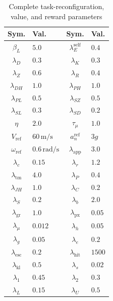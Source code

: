 \documentclass[unbranded]{cja}
\begin{document}
\begin{table}[!htbp]
\centering
\small
\setlength{\tabcolsep}{2.5pt}
\renewcommand{\arraystretch}{1.05}
\caption{Complete task-reconfiguration, value, and reward parameters}
\label{tab:complete-task-reward-parameters}
\begin{tabularx}{\linewidth}{@{}c >{\centering\arraybackslash}X c >{\centering\arraybackslash}X@{}}
\toprule
Sym. & Val. & Sym. & Val. \\
\midrule
$\beta_L$ & $5.0$ & $\lambda_E^{\mathrm{self}}$ & $0.4$ \\
$\lambda_D$ & $0.3$ & $\lambda_K$ & $0.3$ \\
$\lambda_Z$ & $0.6$ & $\lambda_R$ & $0.4$ \\
$\lambda_{DH}$ & $1.0$ & $\lambda_{PH}$ & $1.0$ \\
$\lambda_{PL}$ & $0.5$ & $\lambda_{SZ}$ & $0.5$ \\
$\lambda_{SL}$ & $0.3$ & $\lambda_{SD}$ & $0.2$ \\
$\eta$ & $2.0$ & $\tau_{\mu}$ & $1.0$ \\
$V_{\mathrm{ref}}$ & $60\,\mathrm{m/s}$ & $a_n^{\mathrm{ref}}$ & $3g$ \\
$\omega_{\mathrm{ref}}$ & $0.6\,\mathrm{rad/s}$ & $\lambda_{\mathrm{app}}$ & $3.0$ \\
$\lambda_c$ & $0.15$ & $\lambda_r$ & $1.2$ \\
$\lambda_{\mathrm{tm}}$ & $4.0$ & $\lambda_P$ & $0.4$ \\
$\lambda_{JH}$ & $1.0$ & $\lambda_C$ & $0.2$ \\
$\lambda_S$ & $0.2$ & $\lambda_b$ & $2.0$ \\
$\lambda_{\mathrm{gr}}$ & $1.0$ & $\lambda_{\mathrm{px}}$ & $0.05$ \\
$\lambda_{\mu}$ & $0.012$ & $\lambda_h$ & $0.05$ \\
$\lambda_g$ & $0.05$ & $\lambda_e$ & $0.2$ \\
$\lambda_{\mathrm{esc}}$ & $0.2$ & $\lambda_{\mathrm{hit}}$ & $1500$ \\
$\lambda_{\mathrm{kl}}$ & $0.5$ & $\lambda_s$ & $0.02$ \\
$\lambda_1$ & $0.45$ & $\lambda_2$ & $0.3$ \\
$\lambda_L$ & $0.15$ & $\lambda_U$ & $0.5$ \\
\bottomrule
\end{tabularx}
\end{table}
\end{document}
